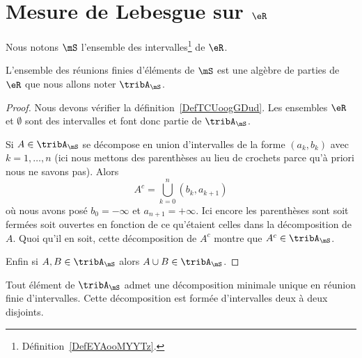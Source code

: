 
\section{Mesure de Lebesgue sur \texorpdfstring{\(  \eR\)}{R}}
\label{SecZTFooXlkwk}

Nous notons \( \mS\) l'ensemble des intervalles\footnote{Définition~\ref{DefEYAooMYYTz}.} de \( \eR\).

\begin{proposition}
	L'ensemble des réunions finies d'éléments de \( \mS\) est une algèbre de parties de \( \eR\) que nous allons noter \( \tribA_{\mS}\).
\end{proposition}

\begin{proof}

	Nous devons vérifier la définition~\ref{DefTCUoogGDud}. Les ensembles \( \eR\) et \( \emptyset\) sont des intervalles et font donc partie de \( \tribA_{\mS}\).

	Si \( A\in\tribA_{\mS}\) se décompose en union d'intervalles de la forme \( (a_k,b_k)\) avec \( k=1,\ldots, n\) (ici nous mettons des parenthèses au lieu de crochets parce qu'à priori nous ne savons pas). Alors
	\begin{equation}
		A^c=\bigcup_{k=0}^{n}(b_k,a_{k+1})
	\end{equation}
	où nous avons posé \( b_0=-\infty\) et \( a_{n+1}=+\infty\). Ici encore les parenthèses sont soit fermées soit ouvertes en fonction de ce qu'étaient celles dans la décomposition de \( A\). Quoi qu'il en soit, cette décomposition de \( A^c\) montre que \( A^c\in\tribA_{\mS}\).

	Enfin si \( A,B\in\tribA_{\mS}\) alors \( A\cup B\in\tribA_{\mS}\).
\end{proof}

\begin{lemma}
	Tout élément de \( \tribA_{\mS}\) admet une décomposition minimale unique en réunion finie d'intervalles. Cette décomposition est formée d'intervalles deux à deux disjoints.
\end{lemma}

